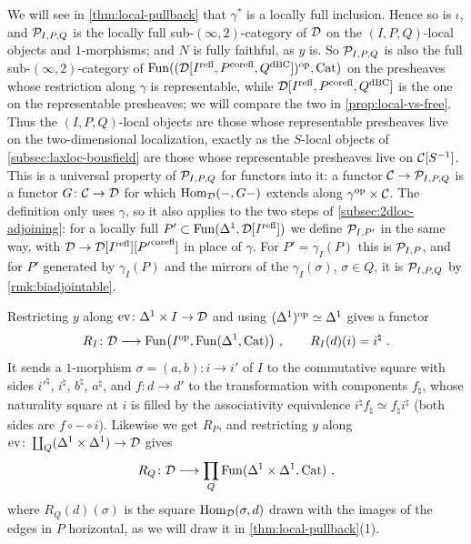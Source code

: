 %
We will see in \cref{thm:local-pullback} that $\gamma^{*}$ is a locally full
inclusion. Hence so is $\iota$, and $\mathcal{P}_{I,P,Q}$ is the locally full
sub-$(\infty,2)$-category of $\mathcal{D}$ on the $(I,P,Q)$-local objects and
$1$-morphisms; and $N$ is fully faithful, as $y$ is.
So $\mathcal{P}_{I,P,Q}$ is also the full sub-$(\infty,2)$-category of
$\operatorname{Fun}((\mathcal{D}[{I}^{\mathrm{refl}},{P}^{\mathrm{corefl}},{Q}^{\mathrm{dBC}}])^{\mathrm{op}},\mathrm{Cat})$
on the presheaves whose restriction along $\gamma$ is representable,
while $\mathcal{D}[{I}^{\mathrm{refl}},{P}^{\mathrm{corefl}},{Q}^{\mathrm{dBC}}]$ is the one on the representable presheaves;
we will compare the two in \cref{prop:local-vs-free}.
Thus the $(I,P,Q)$-local objects are those whose representable presheaves live
on
the two-dimensional localization, exactly as the $S$-local objects of
\cref{subsec:laxloc-bousfield} are those whose representable presheaves live on
$\mathcal{C}[S^{-1}]$. This is a universal property of $\mathcal{P}_{I,P,Q}$ for functors into
it:
a functor $\mathcal{C} \to \mathcal{P}_{I,P,Q}$ is a functor $G\colon \mathcal{C} \to \mathcal{D}$ for which
$\operatorname{Hom}_{\mathcal{D}}(-,G-)$ extends along
$\gamma^{\mathrm{op}} \times \mathcal{C}$.
The definition only uses $\gamma$, so it also applies to the two steps of
\cref{subsec:2dloc-adjoining}: for a locally full
$P' \subset \operatorname{Fun}(\Delta^{1},\mathcal{D}[{I}^{\mathrm{refl}}])$
we define $\mathcal{P}_{I,P'}$ in the same way, with
$\mathcal{D} \to \mathcal{D}[{I}^{\mathrm{refl}}][{P'}^{\mathrm{corefl}}]$
in place of $\gamma$. For $P' = \gamma_{I}(P)$ this is $\mathcal{P}_{I,P}$,
and for $P'$ generated by $\gamma_{I}(P)$ and the mirrors of the
$\gamma_{I}(\sigma)$, $\sigma \in Q$, it is $\mathcal{P}_{I,P,Q}$
by \cref{rmk:biadjointable}.

%
Restricting $y$ along
$\mathrm{ev}\colon \Delta^{1} \times I \to \mathcal{D}$
and using
$(\Delta^{1})^{\mathrm{op}} \simeq \Delta^{1}$
gives a functor
\begin{equation*}
R_{I}\colon \mathcal{D} \longrightarrow \operatorname{Fun}\bigl(I^{\mathrm{op}},\operatorname{Fun}(\Delta^{1},\mathrm{Cat})\bigr)
\ , \qquad R_{I}(d)(i) = i^{\natural} \ .
\end{equation*}
It sends a $1$-morphism
$\sigma = (a,b)\colon i \to i'$
of $I$ to the commutative square with sides $i'^{\natural}$, $i^{\natural}$,
$b^{\natural}$, $a^{\natural}$, and $f\colon d \to d'$ to the transformation
with components $f_{\natural}$, whose naturality square at $i$ is filled by the
associativity equivalence
$i^{\natural}f_{\natural} \simeq f_{\natural}i^{\natural}$
(both sides are $f \circ - \circ i$). Likewise we get $R_{P}$,
and restricting $y$ along
$\mathrm{ev}\colon \coprod_{Q}(\Delta^{1} \times \Delta^{1}) \to \mathcal{D}$
gives
\begin{equation*}
R_{Q}\colon \mathcal{D} \longrightarrow \prod_{Q}\operatorname{Fun}(\Delta^{1} \times \Delta^{1},\mathrm{Cat})
\ ,
\end{equation*}
where $R_{Q}(d)(\sigma)$ is the square
$\operatorname{Hom}_{\mathcal{D}}(\sigma,d)$
drawn with the images of the edges in $P$ horizontal,
as we will draw it in \cref{thm:local-pullback}(1).


